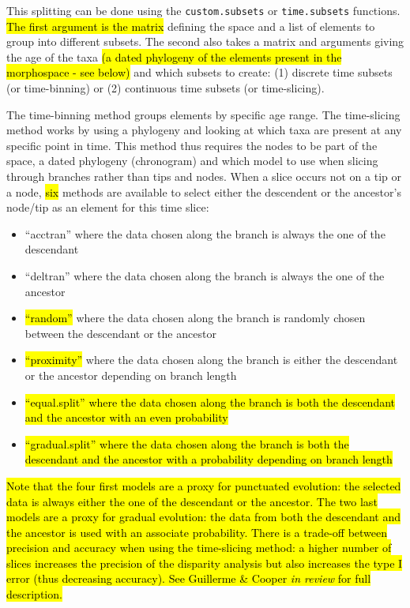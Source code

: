 \documentclass[12pt,letterpaper]{article}
\begin{document}
This splitting can be done using the \texttt{custom.subsets} or \texttt{time.subsets} functions.
\hl{The first argument is the matrix}
defining the space and a list of elements to group into different subsets.
The second also takes a matrix and arguments giving the age of the taxa 
\hl{(a dated phylogeny of the elements present in the morphospace - see below)}
and which subsets to create: (1) discrete time subsets (or time-binning) or (2) continuous time subsets (or time-slicing).

The time-binning method groups elements by specific age range.
The time-slicing method works by using a phylogeny and looking at which taxa are present at any specific point in time.
This method thus requires the nodes to be part of the space, a dated phylogeny (chronogram) and which model to use when slicing through branches rather than tips and nodes.
When a slice occurs not on a tip or a node, \hl{six} methods are available to select either the descendent or the ancestor's node/tip as an element for this time slice:
\begin{itemize}
    \item ``acctran'' where the data chosen along the branch is always the one of the descendant
    \item ``deltran'' where the data chosen along the branch is always the one of the ancestor
    \item \hl{``random''} where the data chosen along the branch is randomly chosen between the descendant or the ancestor
    \item \hl{``proximity''} where the data chosen along the branch is either the descendant or the ancestor depending on branch length
    \item \hl{``equal.split'' where the data chosen along the branch is both the descendant and the ancestor with an even probability}
    \item \hl{``gradual.split'' where the data chosen along the branch is both the descendant and the ancestor with a probability depending on branch length}
\end{itemize}

\hl{Note that the four first models are a proxy for punctuated evolution: the selected data is always either the one of the descendant or the ancestor.
The two last models are a proxy for gradual evolution: the data from both the descendant and the ancestor is used with an associate probability.
There is a trade-off between precision and accuracy when using the time-slicing method: a higher number of slices increases the precision of the disparity analysis but also increases the type I error (thus decreasing accuracy).
See Guillerme \& Cooper \textit{in review} for full description.}
\end{document}
